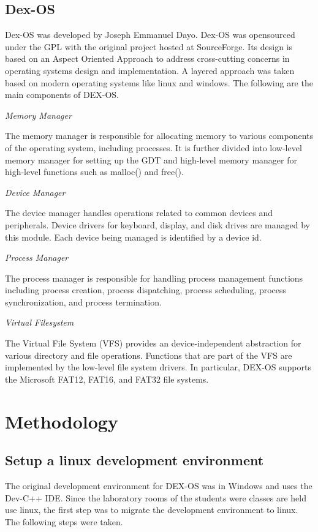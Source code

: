 \documentclass{acm_proc_article-sp}
\begin{document}
\subsection{Dex-OS}
Dex-OS was developed by Joseph Emmanuel Dayo. Dex-OS was opensourced under 
the GPL with the original project hosted at SourceForge. Its design is based on
an Aspect Oriented Approach to address cross-cutting concerns in operating 
systems design and implementation. A layered approach was taken based on 
modern operating systems like linux and windows. The following are the main
components of DEX-OS.

\textit{Memory Manager}

The memory manager is responsible for allocating memory to various components
of the operating system, including processes. It is further divided into 
low-level memory manager for setting up the GDT and high-level memory manager
for high-level functions such as malloc() and free().

\textit{Device Manager}

The device manager handles operations related to common devices and peripherals.
Device drivers for keyboard, display, and disk drives are managed by this 
module. Each device being managed is identified by a device id. 

\textit{Process Manager}

The process manager is responsible for handling process management functions
including process creation, process dispatching, process scheduling, process
synchronization, and process termination. 

\textit{Virtual Filesystem}

The Virtual File System (VFS) provides an device-independent abstraction for
various directory and file operations. Functions that are part of the VFS are
implemented by the low-level file system drivers. In particular, DEX-OS 
supports the Microsoft FAT12, FAT16, and FAT32 file systems.

\section{Methodology}

\subsection{Setup a linux development environment}
The original development environment for DEX-OS was in Windows and uses the 
Dev-C++ IDE. Since the laboratory rooms of the students were classes are held
use linux, the first step was to migrate the development environment to 
linux. The following steps were taken.
\end{document}
